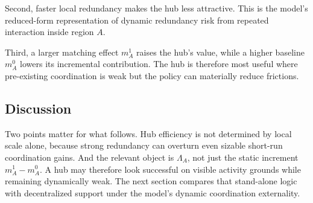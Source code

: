 Second, faster local redundancy makes the hub less attractive. This is the model's reduced-form representation of dynamic redundancy risk from repeated interaction inside region $A$.

Third, a larger matching effect $m_A^1$ raises the hub's value, while a higher baseline $m_A^0$ lowers its incremental contribution. The hub is therefore most useful where pre-existing coordination is weak but the policy can materially reduce frictions.

\subsection{Discussion}

Two points matter for what follows. Hub efficiency is not determined by local scale alone, because strong redundancy can overturn even sizable short-run coordination gains. And the relevant object is $\Lambda_A$, not just the static increment $m_A^1-m_A^0$. A hub may therefore look successful on visible activity grounds while remaining dynamically weak. The next section compares that stand-alone logic with decentralized support under the model's dynamic coordination externality.
